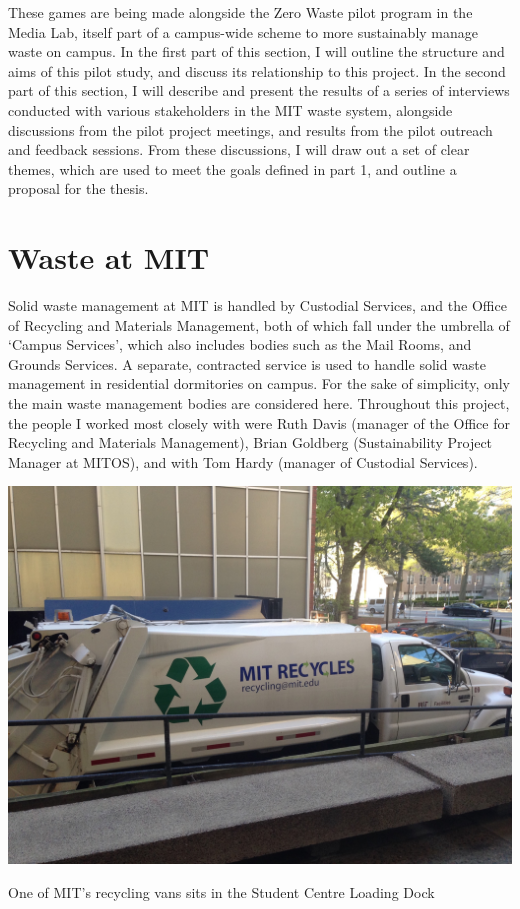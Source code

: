 \documentclass[nofonts,nols,justified,nobib]{tufte-book}
\begin{document}
These games are being made alongside the Zero Waste pilot program in the Media Lab, itself part of a campus-wide scheme to more sustainably manage waste on campus. In the first part of this section, I will outline the structure and aims of this pilot study, and discuss its relationship to this project. In the second part of this section, I will describe and present the results of a series of interviews conducted with various stakeholders in the MIT waste system, alongside discussions from the pilot project meetings, and results from the pilot outreach and feedback sessions. From these discussions, I will draw out a set of clear themes, which are used to meet the goals defined in part 1, and outline a proposal for the thesis.

\newpage

\section*{Waste at MIT}

Solid waste management at MIT is handled by Custodial Services, and the Office of Recycling and Materials Management, both of which fall under the umbrella of `Campus Services', which also includes bodies such as the Mail Rooms, and Grounds Services. A separate, contracted service is used to handle solid waste management in residential dormitories on campus. For the sake of simplicity, only the main waste management bodies are considered here. Throughout this project, the people I worked most closely with were Ruth Davis (manager of the Office for Recycling and Materials Management), Brian Goldberg (Sustainability Project Manager at MITOS), and with Tom Hardy (manager of Custodial Services).

\begin{marginfigure}
\includegraphics[width=\textwidth]{img/2/mit-van.JPG}
\caption{One of MIT's recycling vans sits in the Student Centre Loading Dock}
\end{marginfigure}
\end{document}
